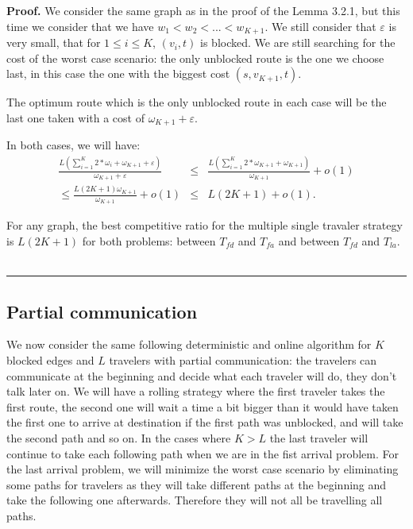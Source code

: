 \documentclass[letter-size, 11pt]{article}
\newenvironment{proof}[1][Proof]{\textbf{#1.} }{\ \rule{0.5em}{0.5em}}
\begin{document}
\begin {proof} We consider the same graph as in the proof of the Lemma 3.2.1, but this time we consider that we have $w_1 < w_2 < ... < w_{K+1}$. We still consider that $\varepsilon$ is very small, that for $1\leq i \leq K$, $(v_i,t)$ is blocked. We are still searching for the cost of the worst case scenario: the only unblocked route is the one we choose last, in this case the one with the biggest cost $(s,v_{K+1},t)$.

The optimum route which is the only unblocked route in each case will be the last one taken with a cost of $\omega_{K+1} + \varepsilon$.

In both cases, we will have:
\begin{eqnarray}
\frac {L(\sum_{i=1}^{K} 2*\omega_{i} + \omega_{K+1} + \varepsilon)} {\omega_{K+1} + \varepsilon} 
&\leq& \frac {L(\sum_{i=1}^{K} 2*\omega_{K+1} + \omega_{K+1})} {\omega_{K+1}} + o(1) \nonumber\\
\leq \frac {L(2K+1)\omega_{K+1} } {\omega_{K+1}} + o(1)
&\leq& L(2K+1) + o(1).\nonumber
\end{eqnarray}

For any graph, the best competitive ratio for the multiple single travaler strategy is $L(2K+1)$ for both problems: between $T_{fd}$ and $T_{fa}$ and between $T_{fd}$ and $T_{la}$.
\end{proof}

\subsection{Partial communication}
We now consider the same following deterministic and online algorithm for $K$ blocked edges and $L$ travelers with partial communication: the travelers can communicate at the beginning and decide what each traveler will do, they don't talk later on. We will have a rolling strategy where the first traveler takes the first route, the second one will wait a time a bit bigger than it would have taken the first one to arrive at destination if the first path was unblocked, and will take the second path and so on. In the cases where $K>L$ the last traveler will continue to take each following path when we are in the fist arrival problem. For the last arrival problem, we will minimize the worst case scenario by eliminating some paths for travelers as they will take different paths at the beginning and take the following one afterwards. Therefore they will not all be travelling all paths.
\end{document}
